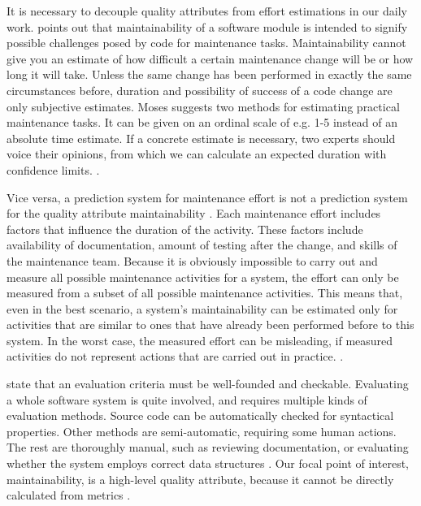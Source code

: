 \documentclass[utf8,english]{gradu3}
\begin{document}
It is necessary to decouple quality attributes from effort estimations in our
daily work. \textcite{Moses2009} points out that maintainability of a software
module is intended to signify possible challenges posed by code for maintenance
tasks. Maintainability cannot give you an estimate of how difficult a certain
maintenance change will be or how long it will take. Unless the same change has
been performed in exactly the same circumstances before, duration and
possibility of success of a code change are only subjective estimates. Moses
suggests two methods for estimating practical maintenance tasks. It can be given
on an ordinal scale of e.g. 1-5 instead of an absolute time estimate. If a
concrete estimate is necessary, two experts should voice their opinions, from
which we can calculate an expected duration with confidence limits.
\parencite[204]{Moses2009}.

Vice versa, a prediction system for maintenance effort is not a prediction
system for the quality attribute maintainability \parencite[206]{Moses2009}.
Each maintenance effort includes factors that influence the duration of the
activity. These factors include availability of documentation, amount of
testing after the change, and skills of the maintenance team. Because it is
obviously impossible to carry out and measure all possible maintenance
activities for a system, the effort can only be measured from a subset of all
possible maintenance activities. This means that, even in the best scenario, a
system's maintainability can be estimated only for activities that are similar
to ones that have already been performed before to this system. In the worst
case, the measured effort can be misleading, if measured activities do not
represent actions that are carried out in practice. \parencite[206]{Moses2009}.

\textcite{Broy2006} state that an evaluation criteria must be well-founded and
checkable. Evaluating a whole software system is quite involved, and requires
multiple kinds of evaluation methods. Source code can be automatically checked
for syntactical properties. Other methods are semi-automatic, requiring some
human actions. The rest are thoroughly manual, such as reviewing documentation,
or evaluating whether the system employs correct data structures
\parencite[22]{Broy2006}. Our focal point of interest, maintainability, is a
high-level quality attribute, because it cannot be directly calculated from
metrics \parencite[60]{Arvanitou2017}.
\end{document}
